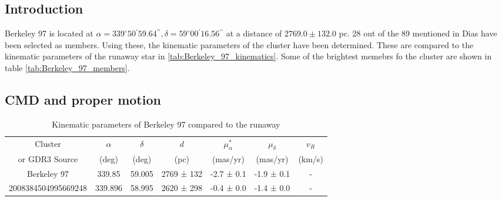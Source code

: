 \subsection{Introduction}
    Berkeley 97 is located at $\alpha = 339^\circ50{}^\prime59.64{}^{\prime\prime}, \delta = 59^\circ00{}^\prime16.56{}^{\prime\prime}$ at a distance of $2769.0\pm132.0$ pc.
    28 out of the 89 mentioned in Dias have been selected as members. Using these, the kinematic parameters of the cluster have been determined. These are compared to the kinematic parameters of the runaway star in \ref{tab:Berkeley_97_kinematics}. Some of the brightest memebrs fo the cluster are shown in table \ref{tab:Berkeley_97_members}.
    
    \subsection{CMD and proper motion}
    
    
    

\begin{table*}[h]
\caption{Kinematic parameters of Berkeley 97 compared to the runaway
\label{tab:Berkeley_97_kinematics_runaways}}
\begin{tabular}{ccccccc}
\hline
Cluster & $\alpha$ & $\delta$ & $d$ & $\mu_{\alpha}^*$ & $\mu_{\delta}$ & $v_R$ \\
or GDR3 Source & (deg) & (deg) & (pc) & (mas/yr) & (mas/yr) & (km/s) \\
\hline
Berkeley 97 & 339.85 & 59.005 & 2769 ± 132 & -2.7 ± 0.1 & -1.9 ± 0.1 & - \\
2008384504995669248 & 339.896 & 58.995 & 2620 ± 298 & -0.4 ± 0.0 & -1.4 ± 0.0 & - \\
\hline
\end{tabular}
\end{table*}


